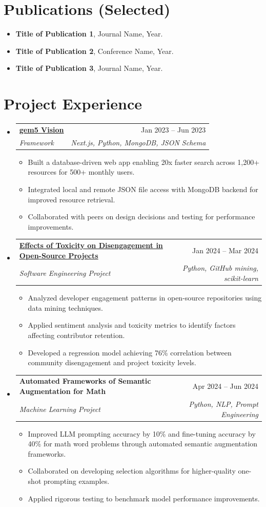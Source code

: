 \documentclass[letterpaper,10pt]{article}
\makeatletter
\newcommand{\resumeItem}[1]{\item\small{#1} \vspace{-3pt}}
\newcommand{\resumeSubheading}[4]{%
  \vspace{-1pt}\item
  \begin{tabular*}{0.97\textwidth}[t]{l@{\extracolsep{\fill}}r}
    \textbf{#1} & #2 \\
    \textit{#3} & \textit{#4} \\
  \end{tabular*}\vspace{-7pt}}
\newcommand{\resumeSubHeadingList}{\begin{itemize}[leftmargin=0.15in, label={}, labelsep=0.15in]}
\newcommand{\resumeJustifiedList}{\begin{itemize}[leftmargin=0.3in, label=\textbullet, labelsep=0.1in]}
\newcommand{\resumeSubHeadingListEnd}{\end{itemize}}
\makeatother
\begin{document}
\section{Publications (Selected)}
{\normalsize
\begin{itemize}[leftmargin=0.15in, label={}, itemsep=0pt]

  \resumeItem{\textbf{Title of Publication 1}, Journal Name, Year.}
  \resumeItem{\textbf{Title of Publication 2}, Conference Name, Year.}
  \resumeItem{\textbf{Title of Publication 3}, Journal Name, Year.}
\end{itemize}
}

\section{Project Experience}
{\normalsize
\resumeSubHeadingList

  \resumeSubheading{\href{https://resources.gem5.org/}{gem5 Vision}}{Jan 2023 -- Jun 2023}{Framework}{Next.js, Python, MongoDB, JSON Schema}
  \resumeJustifiedList
    \resumeItem{Built a database-driven web app enabling 20x faster search across 1,200+ resources for 500+ monthly users.}
    \resumeItem{Integrated local and remote JSON file access with MongoDB backend for improved resource retrieval.}
    \resumeItem{Collaborated with peers on design decisions and testing for performance improvements.}
  \end{itemize}

  \resumeSubheading{\href{https://www.kunpai.space/assets/papers/toxicity.pdf}{Effects of Toxicity on Disengagement in Open-Source Projects}}{Jan 2024 -- Mar 2024}{Software Engineering Project}{Python, GitHub mining, scikit-learn}
  \resumeJustifiedList
    \resumeItem{Analyzed developer engagement patterns in open-source repositories using data mining techniques.}
    \resumeItem{Applied sentiment analysis and toxicity metrics to identify factors affecting contributor retention.}
    \resumeItem{Developed a regression model achieving 76\% correlation between community disengagement and project toxicity levels.}
  \end{itemize}

  \resumeSubheading{Automated Frameworks of Semantic Augmentation for Math}{Apr 2024 -- Jun 2024}{Machine Learning Project}{Python, NLP, Prompt Engineering}
  \resumeJustifiedList
    \resumeItem{Improved LLM prompting accuracy by 10\% and fine-tuning accuracy by 40\% for math word problems through automated semantic augmentation frameworks.}
    \resumeItem{Collaborated on developing selection algorithms for higher-quality one-shot prompting examples.}
    \resumeItem{Applied rigorous testing to benchmark model performance improvements.}
  \end{itemize}

\resumeSubHeadingListEnd
}
\end{document}
